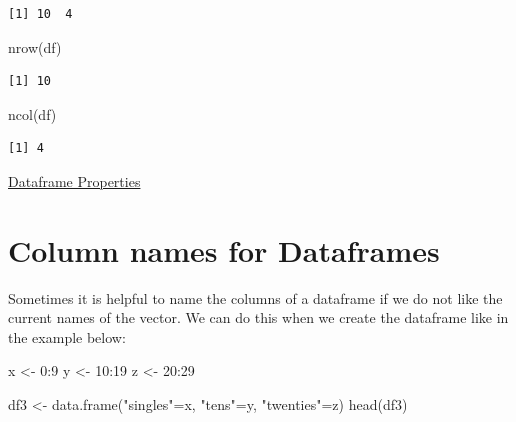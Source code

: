 \documentclass[
  letterpaper,
  DIV=11,
  numbers=noendperiod]{scrreprt}
\newenvironment{Shaded}{\begin{snugshade}}{\end{snugshade}}
\newcommand{\DecValTok}[1]{\textcolor[rgb]{0.68,0.00,0.00}{#1}}
\newcommand{\FunctionTok}[1]{\textcolor[rgb]{0.28,0.35,0.67}{#1}}
\newcommand{\NormalTok}[1]{\textcolor[rgb]{0.00,0.23,0.31}{#1}}
\newcommand{\OtherTok}[1]{\textcolor[rgb]{0.00,0.23,0.31}{#1}}
\newcommand{\SpecialCharTok}[1]{\textcolor[rgb]{0.37,0.37,0.37}{#1}}
\newcommand{\StringTok}[1]{\textcolor[rgb]{0.13,0.47,0.30}{#1}}
\begin{document}
\begin{verbatim}
[1] 10  4
\end{verbatim}

\begin{Shaded}
\begin{Highlighting}[]
\FunctionTok{nrow}\NormalTok{(df)}
\end{Highlighting}
\end{Shaded}

\begin{verbatim}
[1] 10
\end{verbatim}

\begin{Shaded}
\begin{Highlighting}[]
\FunctionTok{ncol}\NormalTok{(df)}
\end{Highlighting}
\end{Shaded}

\begin{verbatim}
[1] 4
\end{verbatim}

\begin{watch}{}{}
    \href{https://youtu.be/fYxmRUeK4qw}{Dataframe Properties}
\end{watch}

\section{Column names for Dataframes}\label{column-names-for-dataframes}

Sometimes it is helpful to name the columns of a dataframe if we do not
like the current names of the vector. We can do this when we create the
dataframe like in the example below:

\begin{Shaded}
\begin{Highlighting}[]
\NormalTok{x }\OtherTok{\textless{}{-}} \DecValTok{0}\SpecialCharTok{:}\DecValTok{9}
\NormalTok{y }\OtherTok{\textless{}{-}} \DecValTok{10}\SpecialCharTok{:}\DecValTok{19}
\NormalTok{z }\OtherTok{\textless{}{-}} \DecValTok{20}\SpecialCharTok{:}\DecValTok{29}

\NormalTok{df3 }\OtherTok{\textless{}{-}} \FunctionTok{data.frame}\NormalTok{(}\StringTok{"singles"}\OtherTok{=}\NormalTok{x, }\StringTok{"tens"}\OtherTok{=}\NormalTok{y, }\StringTok{"twenties"}\OtherTok{=}\NormalTok{z)}
\FunctionTok{head}\NormalTok{(df3)}
\end{Highlighting}
\end{Shaded}
\end{document}
